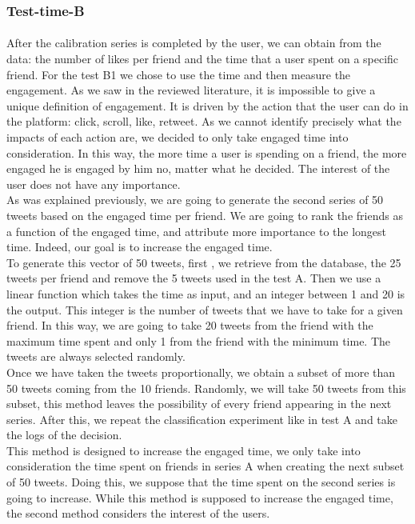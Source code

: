 \subsubsection{Test-time-B}

\paragraph{}
After the calibration series is completed by the user, we can obtain from the data: the number of likes per friend and the time that a user spent on a specific friend. For the test B1 we chose to use the time and then measure the engagement. As we saw in the reviewed literature, it is impossible to give a unique definition of engagement. It is driven by the action that the user can do in the platform: click, scroll, like, retweet. As we cannot identify precisely what the impacts of each action are, we decided to only take engaged time into consideration. In this way, the more time a user is spending on a friend, the more engaged he is engaged by him no, matter what he decided. The interest of the user does not have any importance. \\
As was explained previously, we are going to generate the second series of 50 tweets based on the engaged time per friend. We are going to rank the friends as a function of the engaged time, and attribute more importance to the longest time. Indeed, our goal is to increase the engaged time. \\
To generate this vector of 50 tweets, first , we retrieve from the database, the 25 tweets per friend and remove the 5 tweets used in the test A. Then we use a linear function which takes the time as input, and an integer between 1 and 20 is the output. This integer is the number of tweets that we have to take for a given friend. In this way, we are going to take 20 tweets from the friend with the maximum time spent and only 1 from the friend with the minimum time. The tweets are always selected randomly.\\
Once we have taken the tweets proportionally, we obtain a subset of more than 50 tweets coming from the 10 friends. Randomly, we will take 50 tweets from this subset, this method leaves the possibility of every friend appearing in the next series. After this, we repeat the classification experiment like in test A and take the logs of the decision.\\
This method is designed to increase the engaged time, we only take into consideration the time spent on friends in series A when creating the next subset of 50 tweets. Doing this, we suppose that the time spent on the second series is going to increase. While this method is supposed to increase the engaged time, the second method considers the interest of the users.


